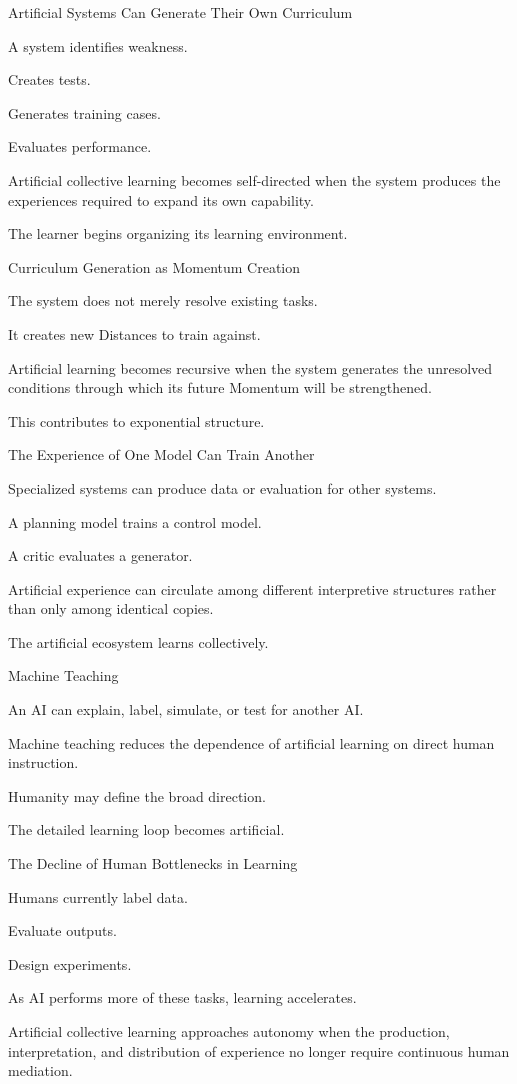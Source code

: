 Artificial Systems Can Generate Their Own Curriculum

A system identifies weakness.

Creates tests.

Generates training cases.

Evaluates performance.

Artificial collective learning becomes self-directed when the system produces the experiences required to expand its own capability.

The learner begins organizing its learning environment.

Curriculum Generation as Momentum Creation

The system does not merely resolve existing tasks.

It creates new Distances to train against.

Artificial learning becomes recursive when the system generates the unresolved conditions through which its future Momentum will be strengthened.

This contributes to exponential structure.

The Experience of One Model Can Train Another

Specialized systems can produce data or evaluation for other systems.

A planning model trains a control model.

A critic evaluates a generator.

Artificial experience can circulate among different interpretive structures rather than only among identical copies.

The artificial ecosystem learns collectively.

Machine Teaching

An AI can explain, label, simulate, or test for another AI.

Machine teaching reduces the dependence of artificial learning on direct human instruction.

Humanity may define the broad direction.

The detailed learning loop becomes artificial.

The Decline of Human Bottlenecks in Learning

Humans currently label data.

Evaluate outputs.

Design experiments.

As AI performs more of these tasks, learning accelerates.

Artificial collective learning approaches autonomy when the production, interpretation, and distribution of experience no longer require continuous human mediation.

